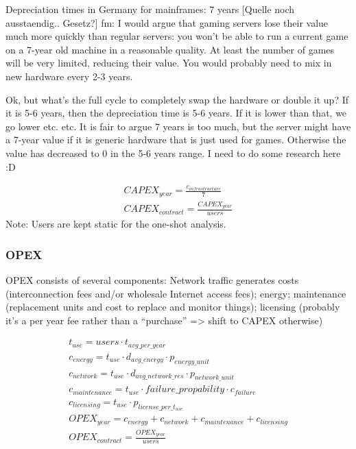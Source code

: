 Depreciation times in Germany for mainframes: 7 years [Quelle noch ausstaendig.. Gesetz?]
fm: I would argue that gaming servers lose their value much more quickly than regular servers: you won't be able to run a current game on a 7-year old machine in a reasonable quality. At least the number of games will be very limited, reducing their value. 
You would probably need to mix in new hardware every 2-3 years.

Ok, but what's the full cycle to completely swap the hardware or double it up? If it is 5-6 years, then the depreciation time is 5-6 years. If it is lower than that, we go lower etc. etc. It is fair to argue 7 years is too much, but the server might have a 7-year value if it is generic hardware that is just used for games. Otherwise the value has decreased to 0 in the 5-6 years range. I need to do some research here :D

\begin{align*}
CAPEX_{year} = \frac{c_{infrastructure}}{7} \\
CAPEX_{contract} = \frac{CAPEX_{year}}{users}
\end{align*}
Note: Users are kept static for the one-shot analysis. 


\subsubsection{OPEX}

OPEX consists of several components: Network traffic generates costs (interconnection fees and/or wholesale Internet access fees); energy; maintenance (replacement units and cost to replace and monitor things); licensing (probably it's a per year fee rather than a ``purchase'' => shift to CAPEX otherwise)

\begin{align*}
t_{use} = users \cdot t_{avg\_per\_year} \\
c_{energy} = t_{use} \cdot d_{avg\_energy} \cdot p_{energy\_unit} \\
c_{network} = t_{use} \cdot d_{avg\_network\_res} \cdot p_{network\_unit} \\
c_{maintenance} = t_{use} \cdot failure\_propability \cdot c_{failure} \\
c_{licensing} = t_{use} \cdot p_{license\_per\_t_{use}} \\
OPEX_{year} = c_{energy} + c_{network} + c_{maintenance} + c_{licensing} \\
OPEX_{contract} = \frac{OPEX_{year}}{users}
\end{align*}

